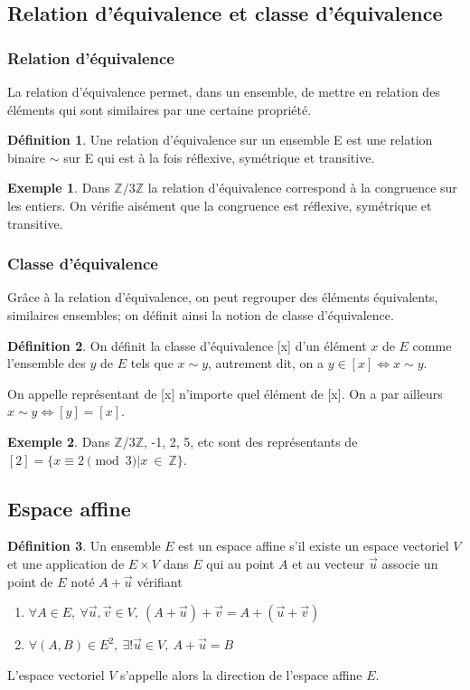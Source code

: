 \documentclass[a4paper,12pt,titlepage]{article}
\theoremstyle{plain}
\theoremstyle{definition}
\newtheorem{defi}{Définition}
\newtheorem{ex}{Exemple}
\begin{document}
\subsection{Relation d'équivalence et classe d'équivalence}
\subsubsection{Relation d'équivalence}
La relation d'équivalence permet, dans un ensemble, de mettre en relation des éléments qui sont similaires par une certaine propriété.
\begin{defi}
Une relation d'équivalence sur un ensemble E est une relation binaire $\sim$ sur E qui est à la fois réflexive, symétrique et transitive.
\end{defi}
\begin{ex}
Dans $\mathbb{Z}/3\mathbb{Z}$ la relation d'équivalence correspond à la congruence sur les entiers. On vérifie aisément que la congruence est réflexive, symétrique et transitive.
\end{ex}
\subsubsection{Classe d'équivalence}
Grâce à la relation d'équivalence, on peut regrouper des éléments équivalents, similaires ensembles; on définit ainsi la notion de classe d'équivalence.
\begin{defi}
On définit la classe d'équivalence [x] d'un élément $x$ de $E$ comme l'ensemble des $y$ de $E$ tels que $x \sim  y$, autrement dit, on a $y \in [x] \Leftrightarrow x \sim  y$.
\end{defi}
\noindent On appelle représentant de [x] n'importe quel élément de [x]. On a par ailleurs $x \sim  y \Leftrightarrow  [y] = [x]$.
\begin{ex}
Dans $\mathbb{Z}/3\mathbb{Z}$, -1, 2, 5, etc sont des représentants de $[2] = \{x \equiv 2 \pmod{3}|x~\in~\mathbb{Z}\}$.
\end{ex}

\subsection{Espace affine}
\begin{defi}
Un ensemble $E$ est un espace affine s'il existe un espace vectoriel $V$ et une application de $E \times V$ dans $E$ qui au point $A$ et au vecteur $\overrightarrow{u}$ associe un point de $E$ noté $A+\overrightarrow{u}$ vérifiant

\begin{enumerate}
\item $ \forall A \in E,~\forall \overrightarrow{u},\overrightarrow{v} \in V,~(A+\overrightarrow{u})+\overrightarrow{v}=A+(\overrightarrow{u}+\overrightarrow{v})$
\item $ \forall (A,B) \in E^2,~\exists!\overrightarrow{u} \in V,~ A+\overrightarrow{u}=B$
\end{enumerate}
L'espace vectoriel $V$ s'appelle alors la direction de l'espace affine $E$.
\end{defi}
\end{document}
